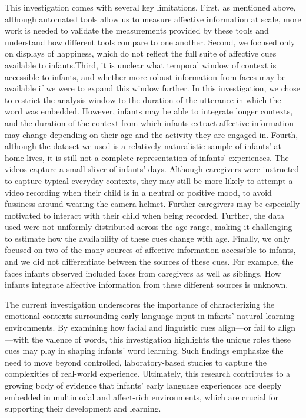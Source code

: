 \documentclass[10pt, letterpaper]{article}
\begin{document}
This investigation comes with several key limitations. First, as
mentioned above, although automated tools allow us to measure affective
information at scale, more work is needed to validate the measurements
provided by these tools and understand how different tools compare to
one another. Second, we focused only on displays of happiness, which do
not reflect the full suite of affective cues available to infants.Third,
it is unclear what temporal window of context is accessible to infants,
and whether more robust information from faces may be available if we
were to expand this window further. In this investigation, we chose to
restrict the analysis window to the duration of the utterance in which
the word was embedded. However, infants may be able to integrate longer
contexts, and the duration of the context from which infants extract
affective information may change depending on their age and the activity
they are engaged in. Fourth, although the dataset we used is a
relatively naturalistic sample of infants' at-home lives, it is still
not a complete representation of infants' experiences. The videos
capture a small sliver of infants' days. Although caregivers were
instructed to capture typical everyday contexts, they may still be more
likely to attempt a video recording when their child is in a neutral or
positive mood, to avoid fussiness around wearing the camera helmet.
Further caregivers may be especially motivated to interact with their
child when being recorded. Further, the data used were not uniformly
distributed across the age range, making it challenging to estimate how
the availability of these cues change with age. Finally, we only focused
on two of the many sources of affective information accessible to
infants, and we did not differentiate between the sources of these cues.
For example, the faces infants observed included faces from caregivers
as well as siblings. How infants integrate affective information from
these different sources is unknown.

The current investigation underscores the importance of characterizing
the emotional contexts surrounding early language input in infants'
natural learning environments. By examining how facial and linguistic
cues align---or fail to align---with the valence of words, this
investigation highlights the unique roles these cues may play in shaping
infants' word learning. Such findings emphasize the need to move beyond
controlled, laboratory-based studies to capture the complexities of
real-world experience. Ultimately, this research contributes to a
growing body of evidence that infants' early language experiences are
deeply embedded in multimodal and affect-rich environments, which are
crucial for supporting their development and learning.
\end{document}
